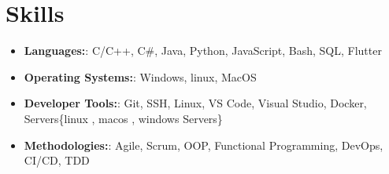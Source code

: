 \documentclass[letterpaper,10.5pt]{article}
\newcommand{\resumeItem}[2]{
  \item\small{
    \textbf{#1}{: #2 \vspace{-2pt}}
  }
}
\newcommand{\resumeItemListStart}{\begin{itemize}}
\newcommand{\resumeItemListEnd}{\end{itemize}\vspace{-5pt}}
\begin{document}

\section{Skills}
\resumeItemListStart
  \resumeItem
    {Languages:}
    {C/C++, C\#, Java, Python, JavaScript, Bash, SQL, Flutter}
  \resumeItem
    {Operating Systems:}
    {Windows, linux, MacOS}
  \resumeItem
    {Developer Tools:}
    {Git, SSH, Linux, VS Code, Visual Studio, Docker, Servers\{linux , macos , windows Servers\}}
  \resumeItem
    {Methodologies:}
    {Agile, Scrum, OOP, Functional Programming, DevOps, CI/CD, TDD}
\resumeItemListEnd

\end{document}
